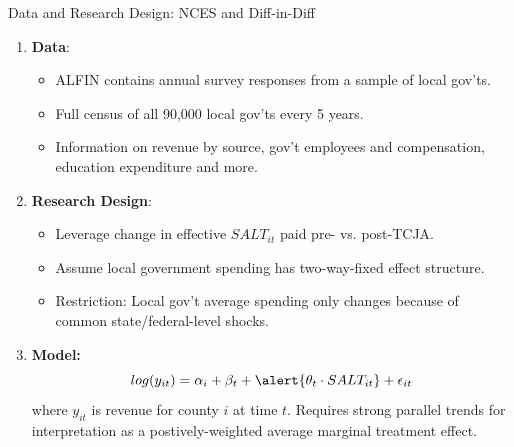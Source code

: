 \documentclass[10pt, aspectratio=169]{beamer}
\begin{document}
\begin{frame}{Data and Research Design: NCES and Diff-in-Diff}
    \begin{enumerate}
        \item \textbf{Data}:
        \begin{itemize}
            \item ALFIN contains annual survey responses from a sample of local gov'ts. 
            \item Full census of all 90,000 local gov'ts every 5 years.
            \item Information on revenue by source, gov't employees and compensation, education expenditure and more.
        \end{itemize}
        \item \textbf{Research Design}:
        \begin{itemize}
            \item Leverage change in effective $SALT_{it}$ paid pre- vs. post-TCJA. 
            \item Assume local government spending has two-way-fixed effect structure.
            \item Restriction: Local gov't average spending only changes because of common state/federal-level shocks.
        \end{itemize}
        \item \textbf{Model:}
        $$log(y_{it}) = \alpha_i + \beta_t + \alert{\theta_t \cdot SALT_{it}} + \epsilon_{it}$$
        where $y_{it}$ is revenue for county $i$ at time $t$. Requires strong parallel trends \citep{CallawayGoodman-BaconSantanna2024} for interpretation as a postively-weighted average marginal treatment effect.
    \end{enumerate}
\end{frame}
\end{document}
